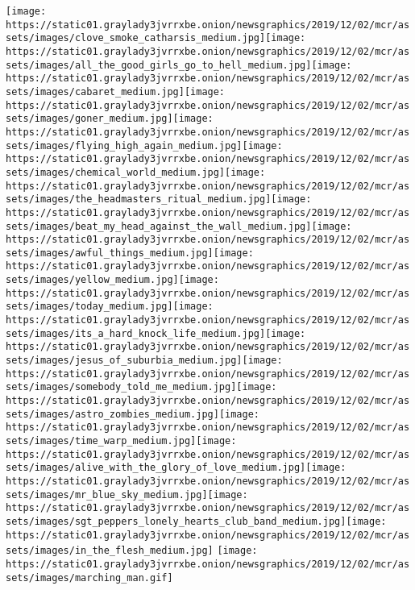 \texttt{[image: https://static01.graylady3jvrrxbe.onion/newsgraphics/2019/12/02/mcr/assets/images/clove\_smoke\_catharsis\_medium.jpg]}\texttt{[image: https://static01.graylady3jvrrxbe.onion/newsgraphics/2019/12/02/mcr/assets/images/all\_the\_good\_girls\_go\_to\_hell\_medium.jpg]}\texttt{[image: https://static01.graylady3jvrrxbe.onion/newsgraphics/2019/12/02/mcr/assets/images/cabaret\_medium.jpg]}\texttt{[image: https://static01.graylady3jvrrxbe.onion/newsgraphics/2019/12/02/mcr/assets/images/goner\_medium.jpg]}\texttt{[image: https://static01.graylady3jvrrxbe.onion/newsgraphics/2019/12/02/mcr/assets/images/flying\_high\_again\_medium.jpg]}\texttt{[image: https://static01.graylady3jvrrxbe.onion/newsgraphics/2019/12/02/mcr/assets/images/chemical\_world\_medium.jpg]}\texttt{[image: https://static01.graylady3jvrrxbe.onion/newsgraphics/2019/12/02/mcr/assets/images/the\_headmasters\_ritual\_medium.jpg]}\texttt{[image: https://static01.graylady3jvrrxbe.onion/newsgraphics/2019/12/02/mcr/assets/images/beat\_my\_head\_against\_the\_wall\_medium.jpg]}\texttt{[image: https://static01.graylady3jvrrxbe.onion/newsgraphics/2019/12/02/mcr/assets/images/awful\_things\_medium.jpg]}\texttt{[image: https://static01.graylady3jvrrxbe.onion/newsgraphics/2019/12/02/mcr/assets/images/yellow\_medium.jpg]}\texttt{[image: https://static01.graylady3jvrrxbe.onion/newsgraphics/2019/12/02/mcr/assets/images/today\_medium.jpg]}\texttt{[image: https://static01.graylady3jvrrxbe.onion/newsgraphics/2019/12/02/mcr/assets/images/its\_a\_hard\_knock\_life\_medium.jpg]}\texttt{[image: https://static01.graylady3jvrrxbe.onion/newsgraphics/2019/12/02/mcr/assets/images/jesus\_of\_suburbia\_medium.jpg]}\texttt{[image: https://static01.graylady3jvrrxbe.onion/newsgraphics/2019/12/02/mcr/assets/images/somebody\_told\_me\_medium.jpg]}\texttt{[image: https://static01.graylady3jvrrxbe.onion/newsgraphics/2019/12/02/mcr/assets/images/astro\_zombies\_medium.jpg]}\texttt{[image: https://static01.graylady3jvrrxbe.onion/newsgraphics/2019/12/02/mcr/assets/images/time\_warp\_medium.jpg]}\texttt{[image: https://static01.graylady3jvrrxbe.onion/newsgraphics/2019/12/02/mcr/assets/images/alive\_with\_the\_glory\_of\_love\_medium.jpg]}\texttt{[image: https://static01.graylady3jvrrxbe.onion/newsgraphics/2019/12/02/mcr/assets/images/mr\_blue\_sky\_medium.jpg]}\texttt{[image: https://static01.graylady3jvrrxbe.onion/newsgraphics/2019/12/02/mcr/assets/images/sgt\_peppers\_lonely\_hearts\_club\_band\_medium.jpg]}\texttt{[image: https://static01.graylady3jvrrxbe.onion/newsgraphics/2019/12/02/mcr/assets/images/in\_the\_flesh\_medium.jpg]}
\texttt{[image: https://static01.graylady3jvrrxbe.onion/newsgraphics/2019/12/02/mcr/assets/images/marching\_man.gif]}

